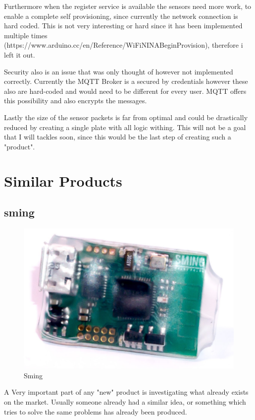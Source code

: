Furthermore when the register service is available the sensors need more work, to enable a complete self provisioning, since currently the network connection is hard coded. This is not very interesting or hard since it has been implemented multiple times (https://www.arduino.cc/en/Reference/WiFiNINABeginProvision), therefore i left it out. 

Security also is an issue that was only thought of however not implemented correctly. Currently the MQTT Broker is a secured by credentials however these also are hard-coded and would need to be different for every user. MQTT offers this possibility and also encrypts the messages.

Lastly the size of the sensor packets is far from optimal and could be drastically reduced by creating a single plate with all logic withing. This will not be a goal that I will tackles soon, since this would be the last step of creating such a "product".

\section{Similar Products}

\subsection{sming}

\begin{figure}
  \begin{center}
\includegraphics[width=\linewidth]{images/sming_pic2.jpg}
  \end{center}
  \caption{\label{fig:Sming}Sming}
\end{figure}
A Very important part of any "new" product is investigating what already exists on the market.
Usually someone already had a similar idea, or something which tries to solve the same problems has already been produced. 

